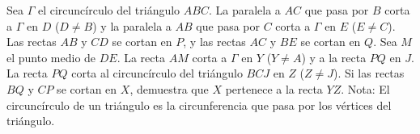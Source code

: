 Sea $\Gamma$ el circuncírculo del triángulo $ABC$. La paralela a $AC$ que pasa por $B$ corta a $\Gamma$ en $D$ ($D \neq B$) y la paralela a $AB$ que pasa por $C$ corta a $\Gamma$ en $E$ ($E \neq C$). Las rectas $AB$ y $CD$ se cortan en $P$, y las rectas $AC$ y $BE$ se cortan en $Q$. Sea $M$ el punto medio de $DE$. La recta $AM$ corta a $\Gamma$ en $Y$ ($Y \neq A$) y a la recta $PQ$ en $J$. La recta $PQ$ corta al circuncírculo del triángulo $BCJ$ en $Z$ ($Z \neq J$). Si las rectas $BQ$ y $CP$ se cortan en $X$, demuestra que $X$ pertenece a la recta $YZ$. \newline 
Nota: El circuncírculo de un triángulo es la circunferencia que pasa por los vértices del triángulo.
